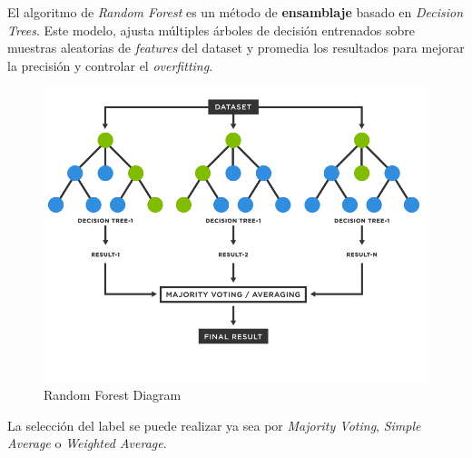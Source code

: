El algoritmo de \textit{Random Forest} es un método de \textbf{ensamblaje} basado en \textit{Decision Trees}. Este modelo, ajusta múltiples árboles de decisión entrenados sobre muestras aleatorias de \textit{features} del dataset y promedia los resultados para mejorar la precisión y controlar el \textit{overfitting}.

\begin{figure}[H]
    \center
    \includegraphics[scale=0.25]{notebooks/ML/img/random_forest_diagram.png}
    \caption{Random Forest Diagram}
\end{figure}

La selección del label se puede realizar ya sea por \textit{Majority Voting}, \textit{Simple Average} o \textit{Weighted Average}.

